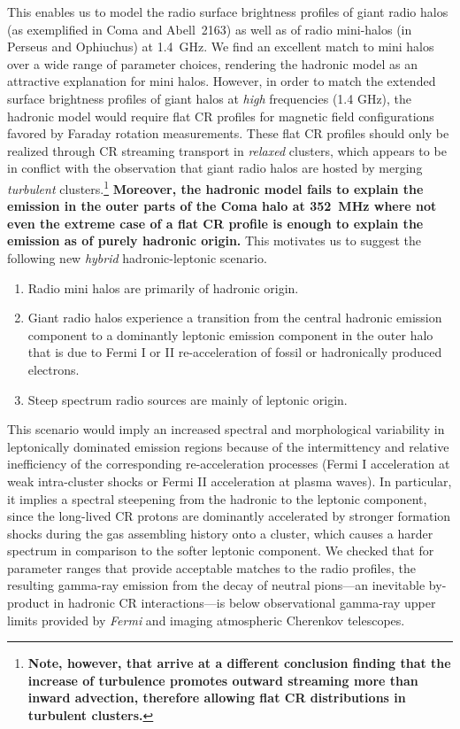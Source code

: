 \documentclass[useAMS,usenatbib]{mn2e}
\begin{document}
This enables us to model the radio surface brightness profiles of giant radio
halos (as exemplified in Coma and Abell~2163) as well as of radio mini-halos (in
Perseus and Ophiuchus) at 1.4~GHz. We find an excellent match to mini halos over
a wide range of parameter choices, rendering the hadronic model as an attractive
explanation for mini halos. However, in order to match the extended surface
brightness profiles of giant halos at {\em high} frequencies (1.4 GHz), the
hadronic model would require flat CR profiles for magnetic field configurations
favored by Faraday rotation measurements. These flat CR profiles should only be
realized through CR streaming transport in {\em relaxed} clusters, which appears
to be in conflict with the observation that giant radio halos are hosted by merging
{\em turbulent} clusters.\footnote{{\bf Note, however, that \cite{2013arXiv1303.4746W} 
   arrive at a different conclusion finding that the increase of turbulence promotes 
   outward streaming more than inward advection, therefore allowing flat CR 
   distributions in turbulent clusters.}} 
{\bf Moreover, the hadronic model fails to explain the emission in the outer parts of the 
Coma halo at 352~MHz where not even the extreme case of
a flat CR profile is enough to explain the emission as of purely hadronic origin.} 
This motivates us to suggest the following new \emph{hybrid} hadronic-leptonic scenario.
\begin{enumerate}
\item Radio mini halos are primarily of hadronic origin.  
\item Giant radio halos experience a transition from the central hadronic
  emission component to a dominantly leptonic emission component in the outer
  halo that is due to Fermi I or II re-acceleration of fossil or hadronically
  produced electrons.
\item Steep spectrum radio sources are mainly of leptonic origin.
\end{enumerate}
This scenario would imply an increased spectral and morphological variability in
leptonically dominated emission regions because of the intermittency and
relative inefficiency of the corresponding re-acceleration processes (Fermi I
acceleration at weak intra-cluster shocks or Fermi II acceleration at plasma
waves). In particular, it implies a spectral steepening from the hadronic to the
leptonic component, since the long-lived CR protons are dominantly accelerated
by stronger formation shocks during the gas assembling history onto a cluster,
which causes a harder spectrum in comparison to the softer leptonic component.
We checked that for parameter ranges that provide acceptable matches to the
radio profiles, the resulting gamma-ray emission from the decay of neutral
pions---an inevitable by-product in hadronic CR interactions---is below
observational gamma-ray upper limits provided by {\em Fermi} and imaging
atmospheric Cherenkov telescopes.
\end{document}
